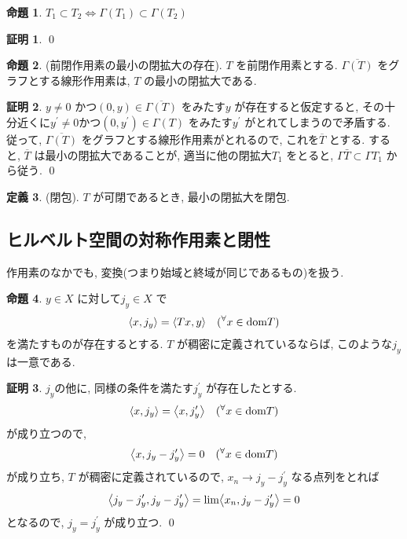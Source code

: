 \documentclass[10pt, fleqn, label-section=none]{bxjsarticle}
\theoremstyle{definition}
\newtheorem{dfn}{定義}[section]
\newtheorem{prop}[dfn]{命題}
\newtheorem*{pf*}{証明}
\newcommand{\any}{{}^{\forall}}
\newcommand{\tbra}[1]{\mleft\langle#1\mright\rangle}
\newcommand{\LR}{\Leftrightarrow}
\renewcommand{\;}{\, ; \,}
\begin{document}
\begin{prop}
$T_1 \subset T_2 \LR \Gamma(T_1) \subset \Gamma(T_2)$ 
\end{prop}
\begin{pf*}

\qed
\end{pf*}


\begin{prop}(前閉作用素の最小の閉拡大の存在).
$T$ を前閉作用素とする. $\overline{\Gamma(T)}$ をグラフとする線形作用素は, $T$ の最小の閉拡大である. 
\end{prop}
\begin{pf*}
$y \neq0$ かつ$(0, y ) \in \overline{\Gamma(T)} $ をみたす$y$ が存在すると仮定すると, その十分近くに$y^\prime \neq 0$かつ$(0,y^\prime ) \in \Gamma(T)$ をみたす$y^\prime$ がとれてしまうので矛盾する. 従って, $\overline{\Gamma(T)}$ をグラフとする線形作用素がとれるので, これを$\overline{T}$ とする. すると, $\overline{T}$ は最小の閉拡大であることが, 適当に他の閉拡大$T_1$ をとると, $\Gamma{\bar T} \subset \Gamma{T_1} $ から従う. 
\qed
\end{pf*}


\begin{dfn}(閉包).
$T$ が可閉であるとき, 最小の閉拡大を$閉包$.
\end{dfn}





\subsection{ヒルベルト空間の対称作用素と閉性}

作用素のなかでも, 変換(つまり始域と終域が同じであるもの)を扱う. 

\begin{prop}$y \in X$ に対して$j_y \in X$ で
\begin{align*} \tbra{x, j_y} =  \tbra{Tx, y} \quad (\any x \in \textrm{dom}T)\end{align*}
を満たすものが存在するとする. $T$ が稠密に定義されているならば, このような$j_y$ は一意である. 
\end{prop}
\begin{pf*}
$j_y$の他に, 同様の条件を満たす$j^\prime_y$ が存在したとする. 
\begin{align*} \tbra{x, j_y} = \tbra{x, j^\prime_y} \quad (\any x \in \textrm{dom} T) \end{align*} 
が成り立つので, 
\begin{align*} \tbra{x, j_y  -  j^\prime_y} = 0 \quad (\any x \in \textrm{dom} T)\end{align*}
が成り立ち, $T$ が稠密に定義されているので, $x_n \rightarrow j_y - j^\prime_y$ なる点列をとれば
\begin{align*} \tbra{j_y - j^\prime_y, j_y - j^\prime_y} = \lim \tbra{x_n , j_y - j^\prime_y} = 0 \end{align*}
となるので, $j_y = j^\prime _y$ が成り立つ. 
\qed
\end{pf*}
\end{document}
